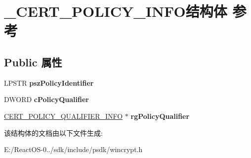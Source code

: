 \hypertarget{struct___c_e_r_t___p_o_l_i_c_y___i_n_f_o}{}\section{\+\_\+\+C\+E\+R\+T\+\_\+\+P\+O\+L\+I\+C\+Y\+\_\+\+I\+N\+F\+O结构体 参考}
\label{struct___c_e_r_t___p_o_l_i_c_y___i_n_f_o}
\subsection*{Public 属性}
\begin{DoxyCompactItemize}
\item 
\mbox{\label{struct___c_e_r_t___p_o_l_i_c_y___i_n_f_o_aa6ff65790249552fcb8b0e75508528e1}} 
L\+P\+S\+TR {\bfseries psz\+Policy\+Identifier}
\item 
\mbox{\label{struct___c_e_r_t___p_o_l_i_c_y___i_n_f_o_ad20f09244e97428c7d7d8ea55735a265}} 
D\+W\+O\+RD {\bfseries c\+Policy\+Qualifier}
\item 
\mbox{\label{struct___c_e_r_t___p_o_l_i_c_y___i_n_f_o_a6af4d55c7845d6dd6ddd5aaeba82a54b}} 
\hyperlink{struct___c_e_r_t___p_o_l_i_c_y___q_u_a_l_i_f_i_e_r___i_n_f_o}{C\+E\+R\+T\+\_\+\+P\+O\+L\+I\+C\+Y\+\_\+\+Q\+U\+A\+L\+I\+F\+I\+E\+R\+\_\+\+I\+N\+FO} $\ast$ {\bfseries rg\+Policy\+Qualifier}
\end{DoxyCompactItemize}


该结构体的文档由以下文件生成\+:\begin{DoxyCompactItemize}
\item 
E\+:/\+React\+O\+S-\/0../sdk/include/psdk/wincrypt.\+h\end{DoxyCompactItemize}
